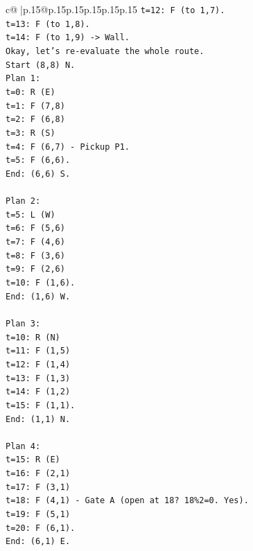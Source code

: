 \documentclass{article}
\begin{document}
{\begin{supertabular}{c@{$\;$}|p{.15\linewidth}@{}p{.15\linewidth}p{.15\linewidth}p{.15\linewidth}p{.15\linewidth}p{.15\linewidth}}
{{{\texttt{t=12: F (to 1,7).} \\
\texttt{t=13: F (to 1,8).} \\
\texttt{t=14: F (to 1,9) {-}> Wall.} \\
\texttt{Okay, let's re{-}evaluate the whole route.} \\
\texttt{Start (8,8) N.} \\
\texttt{Plan 1:} \\
\texttt{t=0: R (E)} \\
\texttt{t=1: F (7,8)} \\
\texttt{t=2: F (6,8)} \\
\texttt{t=3: R (S)} \\
\texttt{t=4: F (6,7) {-} Pickup P1.} \\
\texttt{t=5: F (6,6).} \\
\texttt{End: (6,6) S.} \\
\\ 
\texttt{Plan 2:} \\
\texttt{t=5: L (W)} \\
\texttt{t=6: F (5,6)} \\
\texttt{t=7: F (4,6)} \\
\texttt{t=8: F (3,6)} \\
\texttt{t=9: F (2,6)} \\
\texttt{t=10: F (1,6).} \\
\texttt{End: (1,6) W.} \\
\\ 
\texttt{Plan 3:} \\
\texttt{t=10: R (N)} \\
\texttt{t=11: F (1,5)} \\
\texttt{t=12: F (1,4)} \\
\texttt{t=13: F (1,3)} \\
\texttt{t=14: F (1,2)} \\
\texttt{t=15: F (1,1).} \\
\texttt{End: (1,1) N.} \\
\\ 
\texttt{Plan 4:} \\
\texttt{t=15: R (E)} \\
\texttt{t=16: F (2,1)} \\
\texttt{t=17: F (3,1)} \\
\texttt{t=18: F (4,1) {-} Gate A (open at 18? 18\%2=0. Yes).} \\
\texttt{t=19: F (5,1)} \\
\texttt{t=20: F (6,1).} \\
\texttt{End: (6,1) E.} \\
}}}
\end{supertabular}}
\end{document}

